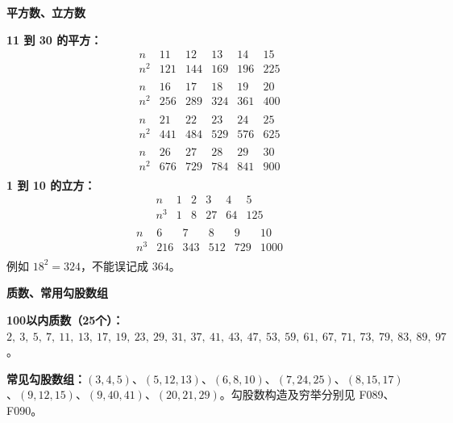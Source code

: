\clearpage
\begin{explanationbox}
\textbf{\textcolor{CExplanation}{平方数、立方数}}
\par\medskip
\begin{center}

\end{center}
\medskip
\textbf{11 到 30 的平方：}\[\begin{array}{c|c|c|c|c|c}
n & 11 & 12 & 13 & 14 & 15\\\hline
n^2 & 121 & 144 & 169 & 196 & 225\\\end{array}\]
\[\begin{array}{c|c|c|c|c|c}
n & 16 & 17 & 18 & 19 & 20\\\hline
n^2 & 256 & 289 & 324 & 361 & 400\\\end{array}\]
\[\begin{array}{c|c|c|c|c|c}
n & 21 & 22 & 23 & 24 & 25\\\hline
n^2 & 441 & 484 & 529 & 576 & 625\\\end{array}\]
\[\begin{array}{c|c|c|c|c|c}
n & 26 & 27 & 28 & 29 & 30\\\hline
n^2 & 676 & 729 & 784 & 841 & 900\\\end{array}\]\textbf{1 到 10 的立方：}\[\begin{array}{c|c|c|c|c|c}
n & 1 & 2 & 3 & 4 & 5\\\hline
n^3 & 1 & 8 & 27 & 64 & 125\\\end{array}\]
\[\begin{array}{c|c|c|c|c|c}
n & 6 & 7 & 8 & 9 & 10\\\hline
n^3 & 216 & 343 & 512 & 729 & 1000\\\end{array}\]例如 $18^2=324$，不能误记成 $364$。
\end{explanationbox}
\clearpage
\begin{explanationbox}
\textbf{\textcolor{CExplanation}{质数、常用勾股数组}}
\par\medskip
\begin{center}

\end{center}
\medskip
\textbf{100以内质数（25个）：} $2,\ 3,\ 5,\ 7,\ 11,\ 13,\ 17,\ 19,\ 23,\ 29,\ 31,\ 37,\ 41,\ 43,\ 47,\ 53,\ 59,\ 61,\ 67,\ 71,\ 73,\ 79,\ 83,\ 89,\ 97$。\par\textbf{常见勾股数组：}$(3,4,5)$、$(5,12,13)$、$(6,8,10)$、$(7,24,25)$、$(8,15,17)$、$(9,12,15)$、$(9,40,41)$、$(20,21,29)$。勾股数构造及穷举分别见 F089、F090。
\end{explanationbox}
